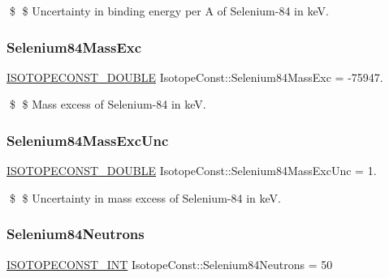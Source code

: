 \$ \$ Uncertainty in binding energy per A of Selenium-\/84 in keV. \mbox{\label{group___isotope_const-_selenium-_se84_ga6a1067c7b6232295df431c562cc098d0}} 
\subsubsection{\texorpdfstring{Selenium84\+Mass\+Exc}{Selenium84MassExc}}
{\footnotesize\ttfamily \mbox{\hyperlink{group___isotope_const-_macros_ga8f45a7272ce02c0b4c65c44636ed719a}{I\+S\+O\+T\+O\+P\+E\+C\+O\+N\+S\+T\+\_\+\+D\+O\+U\+B\+LE}} Isotope\+Const\+::\+Selenium84\+Mass\+Exc = -\/75947.}

\$ \$ Mass excess of Selenium-\/84 in keV. \mbox{\label{group___isotope_const-_selenium-_se84_gae99cdc37e686d033953c76c8376b56d9}} 
\subsubsection{\texorpdfstring{Selenium84\+Mass\+Exc\+Unc}{Selenium84MassExcUnc}}
{\footnotesize\ttfamily \mbox{\hyperlink{group___isotope_const-_macros_ga8f45a7272ce02c0b4c65c44636ed719a}{I\+S\+O\+T\+O\+P\+E\+C\+O\+N\+S\+T\+\_\+\+D\+O\+U\+B\+LE}} Isotope\+Const\+::\+Selenium84\+Mass\+Exc\+Unc = 1.}

\$ \$ Uncertainty in mass excess of Selenium-\/84 in keV. \mbox{\label{group___isotope_const-_selenium-_se84_gac8d5d7840604f84d03f23a85380894d3}} 
\subsubsection{\texorpdfstring{Selenium84\+Neutrons}{Selenium84Neutrons}}
{\footnotesize\ttfamily \mbox{\hyperlink{group___isotope_const-_macros_ga5f18360b3e99483a35c32d789e62621c}{I\+S\+O\+T\+O\+P\+E\+C\+O\+N\+S\+T\+\_\+\+I\+NT}} Isotope\+Const\+::\+Selenium84\+Neutrons = 50}

